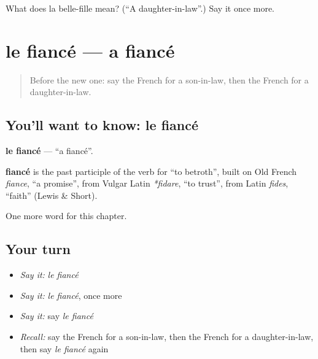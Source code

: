 \begin{tcolorbox}[breakable,colback=teal!4,colframe=teal!35!black,title={Before you move on}]
What does la belle-fille mean? (\textquotedblleft{}A daughter-in-law\textquotedblright{}.) Say it once more.
\end{tcolorbox}
\section[le fiancé]{le fiancé — a fiancé}

\label{lesson:FR-C167-fiance}



\begin{quote}
Before the new one: say the French for a son-in-law, then the French for a daughter-in-law.
\end{quote}

\subsection*{You'll want to know: le fiancé}
\textbf{le fiancé} — \textquotedblleft{}a fiancé\textquotedblright{}.

\begin{cousinweb}
\textbf{fiancé} is the past participle of the verb for \textquotedblleft{}to betroth\textquotedblright{}, built on Old French \emph{fiance}, \textquotedblleft{}a promise\textquotedblright{}, from Vulgar Latin \emph{*fidare}, \textquotedblleft{}to trust\textquotedblright{}, from Latin \emph{fides}, \textquotedblleft{}faith\textquotedblright{} (Lewis \& Short).
\end{cousinweb}

\begin{grammarlens}[title={What you've built}]
One more word for this chapter.
\end{grammarlens}

\subsection*{Your turn}
\begin{itemize}
\raggedright
  \item \emph{Say it:} \emph{le fiancé}
  \item \emph{Say it:} \emph{le fiancé}, once more
  \item \emph{Say it:} say \emph{le fiancé}
  \item \emph{Recall:} say the French for a son-in-law, then the French for a daughter-in-law, then say \emph{le fiancé} again
\end{itemize}

